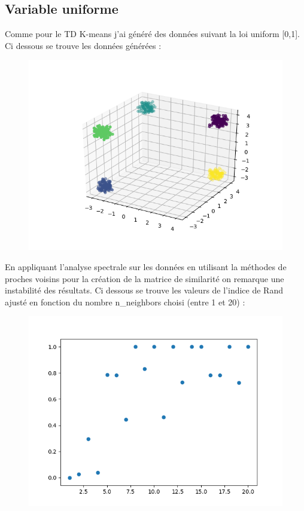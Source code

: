 \documentclass[12pt]{scrartcl} %
\begin{document}
\subsection{Variable uniforme}
Comme pour le TD K-means j'ai généré des données suivant la loi uniform  [0,1]. Ci dessous se trouve les données générées : 
\newline
\begin{figure}[!h]
 \centering 
\includegraphics[scale=.5]{unifSpectrale.png}
\end{figure}
\newline 
En appliquant l'analyse spectrale sur les données en utilisant la méthodes de proches voisins pour la création de la matrice de similarité on remarque une instabilité des résultats. Ci dessous se trouve les valeurs de l'indice de Rand ajusté en fonction du nombre n\_neighbors choisi (entre 1 et 20) : 
\newline
\begin{figure}[!h]
 \centering 
\includegraphics[scale=.3]{spectralUnifNN.png}
\end{figure}
\end{document}
